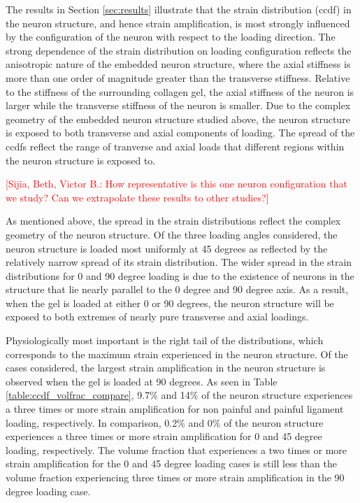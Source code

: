 \documentclass[]{interact}
\newcommand{\red}[1]{\textcolor{red}{[#1]}}
\begin{document}
The results in Section \ref{sec:results} illustrate that the strain distribution (ccdf) in the neuron structure, and hence strain amplification, is most strongly influenced by the configuration of the neuron with respect to the loading direction. The strong dependence of the strain distribution on loading configuration reflects the anisotropic nature of the embedded neuron structure, where the axial stiffness is more than one order of magnitude greater than the transverse stiffness. Relative to the stiffness of the surrounding collagen gel, the axial stiffness of the neuron is larger while the transverse stiffness of the neuron is smaller. Due to the complex geometry of the embedded neuron structure studied above, the neuron structure is exposed to both transverse and axial components of loading. The spread of the ccdfs reflect the range of tranverse and axial loads that different regions within the neuron structure is exposed to.

\red{Sijia, Beth, Victor B.: How representative is this one neuron configuration that we study? Can we extrapolate these results to other studies?} 

As mentioned above, the spread in the strain distributions reflect the complex geometry of the neuron structure. Of the three loading angles considered, the neuron structure is loaded most uniformly at 45 degrees as reflected by the relatively narrow spread of its strain distribution. The wider spread in the strain distributions for 0 and 90 degree loading is due to the existence of neurons in the structure that lie nearly parallel to the 0 degree and 90 degree axis. As a result, when the gel is loaded at either 0 or 90 degrees, the neuron structure will be exposed to both extremes of nearly pure transverse and axial loadings. 

Physiologically most important is the right tail of the distributions, which corresponds to the maximum strain experienced in the neuron structure. Of the cases considered, the largest strain amplification in the neuron structure is observed when the gel is loaded at 90 degrees. As seen in Table \ref{table:ccdf_volfrac_compare}, 9.7$\%$ and 14$\%$ of the neuron structure experiences a three times or more strain amplification for non painful and painful ligament loading, respectively. In comparison,  0.2$\%$  and 0$\%$ of the neuron structure experiences a three times or more strain amplification for 0 and 45 degree loading, respectively. The volume fraction that experiences a two times or more strain amplification for the 0 and 45 degree loading cases is still less than the volume fraction experiencing three times or more strain amplification in the 90 degree loading case.
\end{document}
